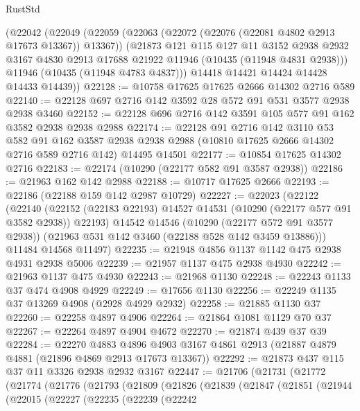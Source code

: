 \begin{lexlean}{RustStd}
\begin{coremodule}
    (@22042
      (@22049
        (@22059
          (@22063 (@22072 (@22076 (@22081 @4802 @2913 @17673 @13367)) @13367))
          (@21873
            @121
            @115
            @127
            @11
            @3152
            @2938
            @2932
            @3167
            @4830
            @2913
            @17688
            @21922
            @11946
            (@10435 (@11948 @4831 @2938)))
          @11946
          (@10435 (@11948 @4783 @4837)))
        @14418
        @14421
        @14424
        @14428
        @14433
        @14439))
@22128 := @10758 @17625 @17625 @2666 @14302 @2716 @589
@22140 := @22128 @697 @2716 @142 @3592 @28 @572 @91 @531 @3577 @2938 @2938 @3460
@22152 := @22128 @696 @2716 @142 @3591 @105 @577 @91 @162 @3582 @2938 @2938 @2988
@22174 := @22128
    @91
    @2716
    @142
    @3110
    @53
    @582
    @91
    @162
    @3587
    @2938
    @2938
    @2988
    (@10810 @17625 @2666 @14302 @2716 @589 @2716 @142)
    @14495
    @14501
@22177 := @10854 @17625 @14302 @2716
@22183 := @22174 (@10290 (@22177 @582 @91 @3587 @2938))
@22186 := @21963 @162 @142 @2988
@22188 := @10717 @17625 @2666
@22193 := @22186 (@22188 @159 @142 @2987 @10729)
@22227 := @22023
    (@22122
      (@22140
        (@22152 (@22183 @22193) @14527 @14531 (@10290 (@22177 @577 @91 @3582 @2938)) @22193)
        @14542
        @14546
        (@10290 (@22177 @572 @91 @3577 @2938))
        (@21963 @531 @142 @3460 (@22188 @528 @142 @3459 @13886)))
      @11484
      @14568
      @11497)
@22235 := @21948 @4856 @1137 @1142 @475 @2938 @4931 @2938 @5006
@22239 := @21957 @1137 @475 @2938 @4930
@22242 := @21963 @1137 @475 @4930
@22243 := @21968 @1130
@22248 := @22243 @1133 @37 @474 @4908 @4929
@22249 := @17656 @1130
@22256 := @22249 @1135 @37 @13269 @4908 (@2928 @4929 @2932)
@22258 := @21885 @1130 @37
@22260 := @22258 @4897 @4906
@22264 := @21864 @1081 @1129 @70 @37
@22267 := @22264 @4897 @4904 @4672
@22270 := @21874 @439 @37 @39
@22284 := @22270
    @4883
    @4896
    @4903
    @3167
    @4861
    @2913
    (@21887 @4879 @4881 (@21896 @4869 @2913 @17673 @13367))
@22292 := @21873 @437 @115 @37 @11 @3326 @2938 @2932 @3167
@22447 := @21706
    (@21731
      (@21772
        (@21774
          (@21776
            (@21793
              (@21809
                (@21826
                  (@21839
                    (@21847
                      (@21851
                        (@21944
                          (@22015
                            (@22227
                              (@22235
                                (@22239
                                  (@22242

\end{coremodule}
\end{lexlean}
